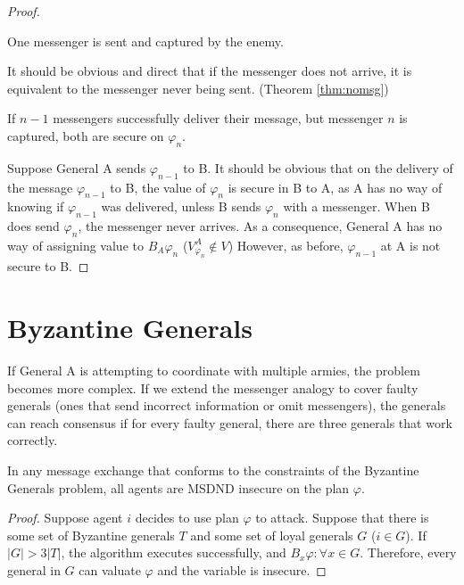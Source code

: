 \begin{proof}
\begin{case}
One messenger is sent and captured by the enemy.
\end{case}

It should be obvious and direct that if the messenger does not arrive, it is equivalent to the messenger never being sent. (Theorem \ref{thm:nomsg})

\begin{case}
If $n-1$ messengers successfully deliver their message, but messenger $n$ is captured, both are secure on $\varphi_{n}$.
\end{case}

Suppose General A sends $\varphi_{n-1}$ to B.
It should be obvious that on the delivery of the message $\varphi_{n-1}$ to B, the value of $\varphi_{n}$ is secure in B to A, as A has no way of knowing if $\varphi_{n-1}$ was delivered, unless B sends $\varphi_{n}$ with a messenger.
When B does send $\varphi_{n}$, the messenger never arrives.
As a consequence, General A has no way of assigning value to $B_A \varphi_n$ ($V_{\varphi_n}^A \not \in V$)
However, as before, $\varphi_{n-1}$ at A is not secure to B.
\end{proof}

\section{Byzantine Generals}

If General A is attempting to coordinate with multiple armies, the problem becomes more complex.
If we extend the messenger analogy to cover faulty generals (ones that send incorrect information or omit messengers), the generals can reach consensus if for every faulty general, there are three generals that work correctly.\cite{byzantine-generals}

\begin{thm}
In any message exchange that conforms to the constraints of the Byzantine Generals problem, all agents are MSDND insecure on the plan $\varphi$.
\end{thm}

\begin{proof}
Suppose agent $i$ decides to use plan $\varphi$ to attack. Suppose that there is some set of Byzantine generals $T$ and some set of loyal generals $G$ ($i \in G$). If $|G| > 3|T|$, the algorithm executes successfully, and $B_x \varphi : \forall x \in G$. Therefore, every general in $G$ can valuate $\varphi$ and the variable is insecure.
\end{proof}

